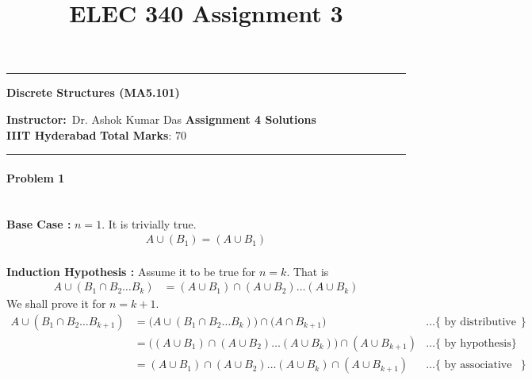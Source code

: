 \documentclass[12pt]{scrartcl}
\title{ELEC 340 Assignment 3}
\begin{document}
\begin{center}
\specialrule{0.02em}{}{}
\hrule
\vspace{0.3cm}
	{\textbf { \large {Discrete Structures (MA5.101) }}} 
\end{center}
\textbf{Instructor:}\ Dr. Ashok Kumar Das \hspace{\fill}\textbf{Assignment 4 Solutions}    \\
{\textbf{IIIT Hyderabad}   } \hspace{\fill} \textbf{Total Marks}: 70 \\ 
\specialrule{0.01em}{}{}
\hrule

\paragraph*{Problem 1 } 
\\ \textbf{Base Case : } $n = 1$.
It is trivially true.
\begin{align*}
    A \cup (B_1) = (A \cup B_1)
\end{align*}
\\
\textbf{Induction Hypothesis : } Assume it to be true for $n = k$. That is 
\begin{align*}
        A \cup (B_1 \cap B_2 \ldots B_{k}) &= (A \cup B_1) \cap (A \cup B_2) \ldots  (A \cup B_k)
\end{align*}
We shall prove it for $n = k+1$.
\small{
\begin{align*}
    A \cup (B_1 \cap B_2 \ldots B_{k+1}) &= \big(A \cup (B_1 \cap B_2 \ldots B_k)\big) \cap \big(A  \cap B_{k+1}\big)  & \ldots \{\text{ by distributive law}\}
    \\ &=  \big((A \cup B_1) \cap (A \cup B_2) \ldots  (A \cup B_k)\big) \cap (A \cup B_{k+1}) & \ldots \{\text{ by hypothesis}\}
    \\ &= (A \cup B_1) \cap (A \cup B_2) \ldots  (A \cup B_k) \cap (A \cup B_{k+1}) & \ldots \{\text{ by associative law}\}
\end{align*}
}
\end{document}
